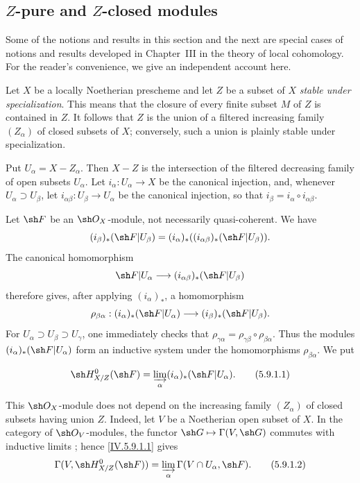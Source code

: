 \subsection{\texorpdfstring{$Z$}{Z}-pure and
\texorpdfstring{$Z$}{Z}-closed modules}
\label{subsection:IV.5.9}

Some of the notions and results in this section and the next are
special cases of notions and results developed in Chapter~III in the
theory of local cohomology.  For the reader's convenience, we give an
independent account here.

\begin{env}[5.9.1]
\label{IV.5.9.1}
Let $X$ be a locally Noetherian prescheme and let $Z$ be a subset of
$X$ \emph{stable under specialization}.  This means that the closure
of every finite subset $M$ of $Z$ is contained in $Z$.  It follows
that $Z$ is the union of a filtered increasing family $(Z_\alpha)$ of
closed subsets of $X$; conversely, such a union is plainly stable
under specialization.

Put $U_\alpha=X-Z_\alpha$.  Then $X-Z$ is the intersection of the
filtered decreasing family of open subsets $U_\alpha$.  Let
$i_\alpha:U_\alpha\to X$ be the canonical injection, and, whenever
$U_\alpha\supset U_\beta$, let
$i_{\alpha\beta}:U_\beta\to U_\alpha$ be the canonical injection, so
that $i_\beta=i_\alpha\circ i_{\alpha\beta}$.

Let $\sh F$ be an $\sh O_X$-module, not necessarily quasi-coherent.
We have
\[
 (i_\beta)_*(\sh F|U_\beta)
 = (i_\alpha)_*((i_{\alpha\beta})_*(\sh F|U_\beta)).
\]
The canonical homomorphism 
\[
  \sh F|U_\alpha\longrightarrow
  (i_{\alpha\beta})_*(\sh F|U_\beta)
\]
therefore gives, after applying $(i_\alpha)_*$, a homomorphism
\[
 \rho_{\beta\alpha}:
 (i_\alpha)_*(\sh F|U_\alpha)\longrightarrow
 (i_\beta)_*(\sh F|U_\beta).
\]
For $U_\alpha\supset U_\beta\supset U_\gamma$, one immediately
checks that
$\rho_{\gamma\alpha}=\rho_{\gamma\beta}\circ\rho_{\beta\alpha}$.
Thus the modules $(i_\alpha)_*(\sh F|U_\alpha)$ form an inductive
system under the homomorphisms $\rho_{\beta\alpha}$.  We put
\end{env}

\begin{equation}
\label{IV.5.9.1.1}
 \sh H^0_{X/Z}(\sh F)
 =\varinjlim_\alpha(i_\alpha)_*(\sh F|U_\alpha).
\tag{5.9.1.1}
\end{equation}

This $\sh O_X$-module does not depend on the increasing family
$(Z_\alpha)$ of closed subsets having union $Z$.  Indeed, let $V$ be
a Noetherian open subset of $X$.  In the category of
$\sh O_V$-modules, the functor
$\sh G\mapsto\Gamma(V,\sh G)$ commutes with inductive limits
; hence \eqref{IV.5.9.1.1} gives
\begin{equation}
\label{IV.5.9.1.2}
 \Gamma(V,\sh H^0_{X/Z}(\sh F))
 =\varinjlim_\alpha\Gamma(V\cap U_\alpha,\sh F).
\tag{5.9.1.2}
\end{equation}

